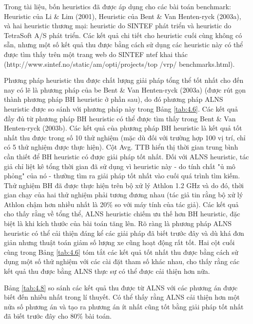 Trong tài liệu, bốn heuristics đã được áp dụng cho các bài toán benchmark: Heuristic của Li \& Lim (2001), Heuristic của Bent \& Van Henten-ryck (2003a), và hai heuristic thương mại: heuristic do SINTEF phát triển và heuristic do TetraSoft A/S phát triển. Các kết quả chi tiết cho heuristic cuối cùng không có sẵn, nhưng một số kết quả thu được bằng cách sử dụng các heuristic này có thể được tìm thấy trên một trang web do SINTEF ntef khai thác (http://www.sintef.no/static/am/opti/projects/top /vrp/ benchmarks.html).

Phương pháp heuristic thu được chất lượng giải pháp tổng thể tốt nhất cho đến nay có lẽ là phương pháp của be Bent \& Van Henten-ryck (2003a) (được rút gọn thành phương pháp BH heuristic ở phần sau), do đó phương pháp ALNS heuristic được so sánh với phương pháp này trong Bảng \ref{tab:4.6}. Các kết quả đầy đủ từ phương pháp BH heuristic có thể được tìm thấy trong Bent \& Van Henten-ryck (2003b). Các kết quả của phương pháp BH heuristic là kết quả tốt nhất thu được trong số 10 thử nghiệm (mặc dù đối với trường hợp 100 vị trí, chỉ có 5 thử nghiệm được thực hiện). Cột Avg. TTB hiển thị thời gian trung bình cần thiết để BH heuristic có được giải pháp tốt nhất. Đối với ALNS heuristic, tác giả chỉ liệt kê tổng thời gian đã sử dụng vì heuristic này - do tính chất "ủ mô phỏng" của nó - thường tìm ra giải pháp tốt nhất vào cuối quá trình tìm kiếm. Thử nghiệm BH đã được thực hiện trên bộ xử lý Athlon 1.2 GHz và do đó, thời gian chạy của hai thử nghiệm phải tương đương nhau (tác giả tin rằng bộ xử lý Athlon chậm hơn nhiều nhất là 20\% so với máy tính của tác giả). Các kết quả cho thấy rằng về tổng thể, ALNS heuristic chiếm ưu thế hơn BH heuristic, đặc biệt là khi kích thước của bài toán tăng lên. Rõ ràng là phương pháp ALNS heuristic có thể cải thiện đáng kể các giải pháp đã biết trước đây và dù khá đơn giản nhưng thuật toán giảm số lượng xe cũng hoạt động rất tốt. Hai cột cuối cùng trong Bảng \ref{tab:4.6} tóm tắt các kết quả tốt nhất thu được bằng cách sử dụng một số thử nghiệm với các cài đặt tham số khác nhau, cho thấy rằng các kết quả thu được bằng ALNS thực sự có thể được cải thiện hơn nữa.

Bảng \ref{tab:4.8} so sánh các kết quả thu được từ ALNS với các phương án được biết đến nhiều nhất trong lí thuyết. Có thể thấy rằng ALNS cải thiện hơn một nửa số phương án và tạo ra phương án ít nhất cũng tốt bằng giải pháp tốt nhất đã biết trước đây cho 80\% bài toán.


